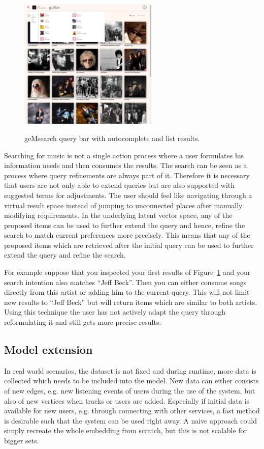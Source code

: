 \documentclass[sigconf]{acmart}
\begin{document}
\begin{figure}[ht]
	{\includegraphics[width=250px]{images/search-autocomplete.png}}	
	\caption{geMsearch query bar with autocomplete and list results.}
	\label{fig:web_client_query}
\end{figure}

Searching for music is not a single action process where a user formulates his information needs and then consumes the results. The search can be seen as a process where query refinements are always part of it. Therefore it is necessary that users are not only able to extend queries but are also supported with suggested terms for adjustments. The user should feel like navigating through a virtual result space instead of jumping to unconnected places after manually modifying requirements. In the underlying latent vector space, any of the proposed items can be used to further extend the query and hence, refine the search to match current preferences more precisely. This means that any of the proposed items which are retrieved after the initial query can be used to further extend the query and refine the search.

For example suppose that you inspected your first results of Figure~\ref{fig:web_client_query} and your search intention also matches ``Jeff Beck''. Then you can either consume songs directly from this artist or adding him to the current query. This will not limit new results to ``Jeff Beck'' but will return items which are similar to both artists. Using this technique the user has not actively adapt the query through reformulating it and still gets more precise results.


\subsection{Model extension}
\label{sec:model_extension}

In real world scenarios, the dataset is not fixed and during runtime, more data is collected which needs to be included into the model. New data can either consists of new edges, e.g. new listening events of users during the use of the system, but also of new vertices when tracks or users are added. Especially if initial data is available for new users, e.g. through connecting with other services, a fast method is desirable such that the system can be used right away. A naive approach could simply recreate the whole embedding from scratch, but this is not scalable for bigger sets.
\end{document}
